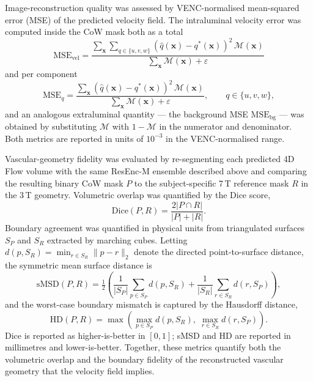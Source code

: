 Image-reconstruction quality was assessed by VENC-normalised
mean-squared error (MSE) of the predicted velocity field. The
intraluminal velocity error was computed inside the CoW mask both
as a total
\begin{equation}
    \mathrm{MSE}_{\text{vel}}
    = \frac{\sum_{\mathbf{x}}
            \sum_{q\in\{u,v,w\}}\!\!
            (\hat{q}(\mathbf{x})-q^{*}(\mathbf{x}))^{2}\,
            \mathcal{M}(\mathbf{x})}
           {\sum_{\mathbf{x}}\mathcal{M}(\mathbf{x}) + \varepsilon}
\end{equation}
and per component
\begin{equation}
    \mathrm{MSE}_{q}
    = \frac{\sum_{\mathbf{x}}
            (\hat{q}(\mathbf{x})-q^{*}(\mathbf{x}))^{2}\,
            \mathcal{M}(\mathbf{x})}
           {\sum_{\mathbf{x}}\mathcal{M}(\mathbf{x}) + \varepsilon},
    \qquad q \in \{u,v,w\},
\end{equation}
and an analogous extraluminal quantity --- the background MSE
$\mathrm{MSE}_{\text{bg}}$ --- was obtained by substituting
$\mathcal{M}$ with $1-\mathcal{M}$ in the numerator and denominator.
Both metrics are reported in units of $10^{-3}$ in the
VENC-normalised range.

Vascular-geometry fidelity was evaluated by re-segmenting each
predicted 4D Flow volume with the same ResEnc-M ensemble described
above and comparing the resulting binary CoW mask $P$ to the
subject-specific 7\,T reference mask $R$ in the 3\,T geometry. Volumetric
overlap was quantified by the Dice score,
\begin{equation}
    \mathrm{Dice}(P,R)
    = \frac{2\lvert P \cap R \rvert}{\lvert P \rvert + \lvert R \rvert}.
\end{equation}
Boundary agreement was quantified in physical units from
triangulated surfaces $S_P$ and $S_R$ extracted by marching cubes.
Letting
$d(p,S_R) = \min_{r \in S_R} \lVert p - r \rVert_{2}$ denote the
directed point-to-surface distance, the symmetric mean surface
distance is
\begin{equation}
    \mathrm{sMSD}(P,R)
    = \tfrac{1}{2}\!\left(
        \frac{1}{|S_P|}\sum_{p\in S_P} d(p,S_R)
        + \frac{1}{|S_R|}\sum_{r\in S_R} d(r,S_P)
      \right),
\end{equation}
and the worst-case boundary mismatch is captured by the Hausdorff
distance,
\begin{equation}
    \mathrm{HD}(P,R)
    = \max\!\left(
        \max_{p\in S_P} d(p,S_R),\;
        \max_{r\in S_R} d(r,S_P)
      \right).
\end{equation}
Dice is reported as higher-is-better in $[0,1]$; sMSD and HD are
reported in millimetres and lower-is-better. Together, these metrics
quantify both the volumetric overlap and the boundary fidelity of the
reconstructed vascular geometry that the velocity field implies.

